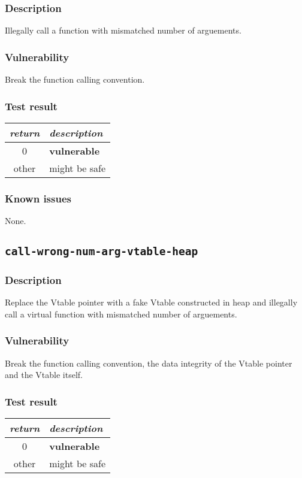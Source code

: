 \documentclass[a4paper]{book}
\begin{document}
\subsubsection{Description}
Illegally call a function with mismatched number of arguements.

\subsubsection{Vulnerability}
Break the function calling convention.

\subsubsection{Test result}
\begin{tabular}{cl}
  \toprule
  \emph{return}  & \emph{description} \\
  \midrule
  0              & \textbf{vulnerable} \\
  other          & might be safe \\
  \bottomrule
\end{tabular}

\subsubsection{Known issues}
None.

\newpage

\subsection{\texttt{call-wrong-num-arg-vtable-heap}}\label{test-call-wrong-num-arg-vtable-heap}

\subsubsection{Description}
Replace the Vtable pointer with a fake Vtable constructed in heap and
illegally call a virtual function with mismatched number of arguements.

\subsubsection{Vulnerability}
Break the function calling convention, the data integrity of the Vtable pointer and the Vtable itself.

\subsubsection{Test result}
\begin{tabular}{cl}
  \toprule
  \emph{return}  & \emph{description} \\
  \midrule
  0              & \textbf{vulnerable} \\
  other          & might be safe \\
  \bottomrule
\end{tabular}
\end{document}

